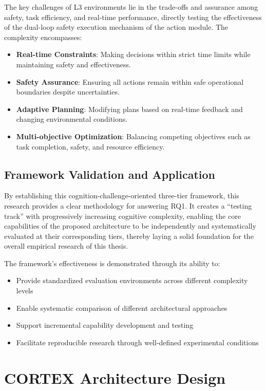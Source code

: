 The key challenges of L3 environments lie in the trade-offs and assurance among safety, task efficiency, and real-time performance, directly testing the effectiveness of the dual-loop safety execution mechanism of the action module. The complexity encompasses:
\begin{itemize}
\item \textbf{Real-time Constraints}: Making decisions within strict time limits while maintaining safety and effectiveness.
\item \textbf{Safety Assurance}: Ensuring all actions remain within safe operational boundaries despite uncertainties.
\item \textbf{Adaptive Planning}: Modifying plans based on real-time feedback and changing environmental conditions.
\item \textbf{Multi-objective Optimization}: Balancing competing objectives such as task completion, safety, and resource efficiency.
\end{itemize}

\subsection{Framework Validation and Application}

By establishing this cognition-challenge-oriented three-tier framework, this research provides a clear methodology for answering RQ1. It creates a ``testing track'' with progressively increasing cognitive complexity, enabling the core capabilities of the proposed architecture to be independently and systematically evaluated at their corresponding tiers, thereby laying a solid foundation for the overall empirical research of this thesis.

The framework's effectiveness is demonstrated through its ability to:
\begin{itemize}
\item Provide standardized evaluation environments across different complexity levels
\item Enable systematic comparison of different architectural approaches
\item Support incremental capability development and testing
\item Facilitate reproducible research through well-defined experimental conditions
\end{itemize}

\section{CORTEX Architecture Design}

